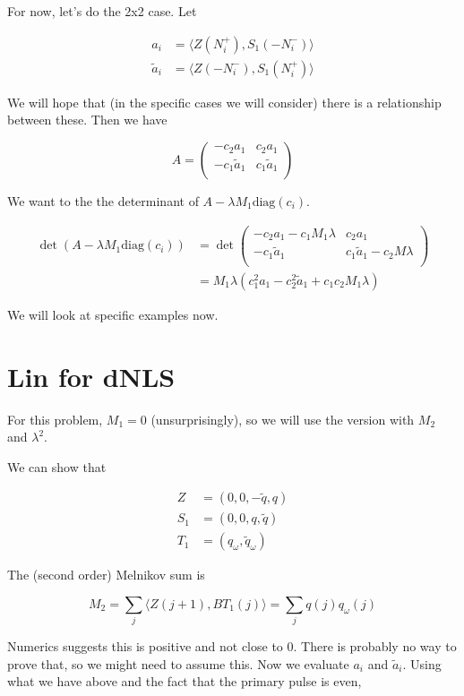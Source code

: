 \documentclass[12pt]{article}
\begin{document}
For now, let's do the 2x2 case. Let

\begin{align*}
a_i &= \langle Z(N_i^+), S_1(-N_i^-) \rangle \\
\tilde{a}_i &= \langle Z(-N_i^-), S_1(N_i^+) \rangle
\end{align*}

We will hope that (in the specific cases we will consider) there is a relationship between these. Then we have 

\[
A = \begin{pmatrix}
-c_2 a_1 & c_2 a_1 \\
-c_1 \tilde{a}_1 & c_1 \tilde{a}_1 \\
\end{pmatrix}
\]

We want to the the determinant of $A - \lambda M_1 \text{diag}(c_i)$.

\begin{align*}
\det( A - \lambda M_1 \text{diag}(c_i)) &= \det \begin{pmatrix}
-c_2 a_1 - c_1 M_1 \lambda & c_2 a_1 \\
-c_1 \tilde{a}_1 & c_1 \tilde{a}_1 - c_2 M \lambda \\
\end{pmatrix} \\
&= M_1 \lambda ( c_1^2 a_1 - c_2^2 \tilde{a}_1 + c_1 c_2 M_1 \lambda )
\end{align*}

We will look at specific examples now.


\section*{Lin for dNLS}

For this problem, $M_1 = 0$ (unsurprisingly), so we will use the version with $M_2$ and $\lambda^2$.

We can show that

\begin{align*}
Z &= (0, 0, -\tilde{q}, q) \\
S_1 &= (0, 0, q, \tilde{q}) \\
T_1 &= (q_\omega, \tilde{q}_\omega)
\end{align*}

The (second order) Melnikov sum is

\[
M_2 = \sum_j \langle Z(j+1), B T_1(j) \rangle = \sum_j q(j) q_\omega(j)
\]

Numerics suggests this is positive and not close to 0. There is probably no way to prove that, so we might need to assume this. Now we evaluate $a_i$ and $\tilde{a}_i$. Using what we have above and the fact that the primary pulse is even,
\end{document}
